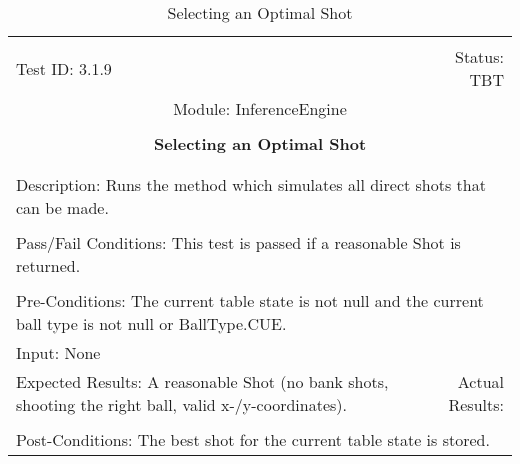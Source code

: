 \documentclass[titlepage]{article}
\begin{document}
\begin{center}%
\begin{table}
\begin{tabular}{|l r|}\hline&\\[-2mm]
	Test ID: 3.1.9	&Status: TBT\\[-3mm]
	\multicolumn{2}{|c|}{Module: InferenceEngine}\\&\\
	\multicolumn{2}{|c|}{\textbf{\large{Selecting an Optimal Shot}}}\\&\\\hline&\\[-3mm]
	\multicolumn{2}{|p{\textwidth}|}{Description: Runs the method which simulates all direct shots that can be made.}\\[1mm]\hline&\\[-3mm]
	\multicolumn{2}{|p{\textwidth}|}{Pass/Fail Conditions: This test is passed if a reasonable Shot is returned.}\\[1mm]\hline&\\[-3mm]
	\multicolumn{2}{|p{\textwidth}|}{Pre-Conditions: The current table state is not null and the current ball type is not null or BallType.CUE.}\\[4mm]
	\multicolumn{2}{|p{\textwidth}|}{Input: None}\\[2mm]\hline
	\multicolumn{1}{|p{0.49\textwidth}}{Expected Results: A reasonable Shot (no bank shots, shooting the right ball, valid x-/y-coordinates).}	&\multicolumn{1}{|p{0.45\textwidth}|}{Actual Results: }\\\hline&\\[-3mm]
	\multicolumn{2}{|p{\textwidth}|}{Post-Conditions: The best shot for the current table state is stored.}\\\hline
\end{tabular}
\caption{Selecting an Optimal Shot}
\end{table}
\end{center}
\end{document}
